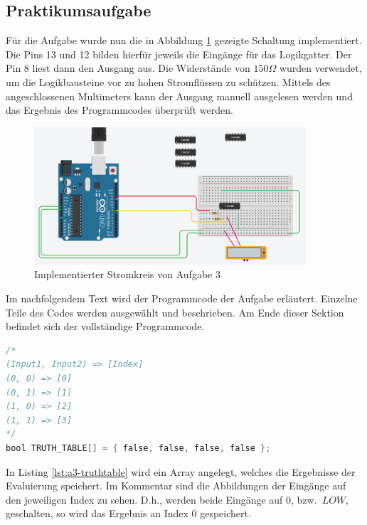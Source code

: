\newpage

\subsection{Praktikumsaufgabe}
\label{subsec:a3-praktikumsaufgabe2}

Für die Aufgabe wurde nun die in Abbildung \ref{fig:a3-implementiert} gezeigte Schaltung implementiert.
Die Pins 13 und 12 bilden hierfür jeweils die Eingänge für das Logikgatter.
Der Pin 8 liest dann den Ausgang aus.
Die Widerstände von $150\Omega$ wurden verwendet, um die Logikbausteine vor zu hohen Stromflüssen zu schützen.
Mittels des angeschlossenen Multimeters kann der Ausgang manuell ausgelesen werden und das Ergebnis des Programmcodes überprüft werden.

\begin{figure}[ht]
    \centering
    \includegraphics[width=0.9\textwidth]{pictures/a3-praktik.png}
    \caption{Implementierter Stromkreis von Aufgabe 3}
    \label{fig:a3-implementiert}
\end{figure}

Im nachfolgendem Text wird der Programmcode der Aufgabe erläutert.
Einzelne Teile des Codes werden ausgewählt und beschrieben.
Am Ende dieser Sektion befindet sich der vollständige Programmcode.

\begin{lstlisting}[language=C,label={lst:a3-truthtable}, caption={Variable für die Wahrheitstabelle}]
/*
(Input1, Input2) => [Index]
(0, 0) => [0]
(0, 1) => [1]
(1, 0) => [2]
(1, 1) => [3]
*/
bool TRUTH_TABLE[] = { false, false, false, false };
\end{lstlisting}

In Listing \ref{lst:a3-truthtable} wird ein Array angelegt, welches die Ergebnisse der Evaluierung speichert.
Im Kommentar sind die Abbildungen der Eingänge auf den jeweiligen Index zu sehen.
D.h., werden beide Eingänge auf 0, bzw.\ $LOW$, geschalten, so wird das Ergebnis an Index 0 gespeichert.

